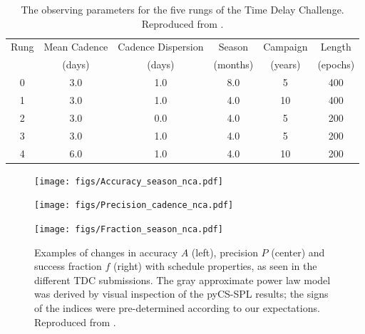 \begin{table}
\begin{center}
\capstart
\begin{tabular}{cccccc} \hline\hline
  Rung &  Mean Cadence & Cadence Dispersion & Season   & Campaign & Length   \\
       &  (days)       & (days)             & (months) & (years)  & (epochs) \\ \hline
  0    &    3.0        &   1.0              &   8.0    &    5     & 400      \\
  1    &    3.0        &   1.0              &   4.0    &    10    & 400      \\
  2    &    3.0        &   0.0              &   4.0    &    5     & 200      \\
  3    &    3.0        &   1.0              &   4.0    &    5     & 200      \\
  4    &    6.0        &   1.0              &   4.0    &    10    & 200      \\
\hline\hline
\end{tabular}
\end{center}
\caption{The observing parameters for the five rungs of the Time Delay
Challenge. Reproduced from \citet{LiaoEtal2015}.\label{tab:tdcrungs}}
\end{table}

\begin{figure}[!ht]
  \capstart
  \begin{minipage}[b]{\linewidth}
    \begin{minipage}[b]{0.32\linewidth}
      \centering\texttt{[image: figs/Accuracy\_season\_nca.pdf]}
    \end{minipage} \hfill
    \begin{minipage}[b]{0.32\linewidth}
      \centering\texttt{[image: figs/Precision\_cadence\_nca.pdf]}
    \end{minipage} \hfill
    \begin{minipage}[b]{0.32\linewidth}
      \centering\texttt{[image: figs/Fraction\_season\_nca.pdf]}
    \end{minipage}
  \end{minipage}
\caption{Examples of changes in accuracy $A$ (left), precision $P$
(center) and success fraction $f$ (right) with schedule properties, as
seen in the different TDC submissions. The gray approximate power law
model was derived by visual inspection of the pyCS-SPL results; the
signs of the indices were pre-determined according to our expectations.
Reproduced from \citet{LiaoEtal2015}.}
\label{fig:tdcresults}
\end{figure}

